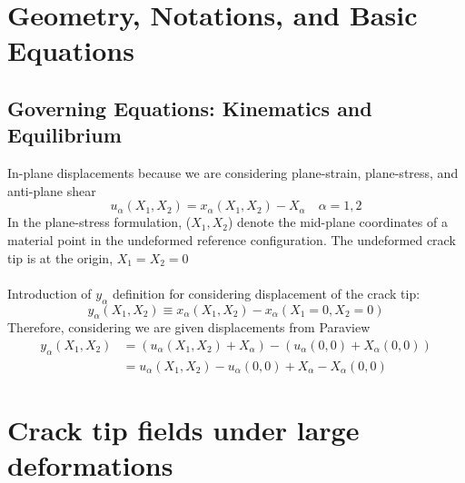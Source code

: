 \documentclass[12pt,3p]{article}
\numberwithin{equation}{section}
\begin{document}
\section{Geometry, Notations, and Basic Equations}

\subsection{Governing Equations: Kinematics and Equilibrium}
In-plane displacements because we are considering plane-strain, plane-stress, and anti-plane shear
\begin{equation}
u_{\alpha}\left(X_{1}, X_{2}\right)=x_{\alpha}\left(X_{1}, X_{2}\right)-X_{\alpha} \quad \alpha=1,2
\end{equation}
In the plane-stress formulation, ($X_1, X_2$) denote the mid-plane coordinates of a material point in the undeformed reference configuration. The undeformed crack tip is at the origin, $X_1 = X_2 = 0$\\ \\
Introduction of $y_\alpha$ definition for considering displacement of the crack tip: 
\begin{equation}
y_{\alpha}\left(X_{1}, X_{2}\right) \equiv x_{\alpha}\left(X_{1}, X_{2}\right)-x_{\alpha}\left(X_{1}=0, X_{2}=0\right)
\end{equation}
Therefore, considering we are given displacements from Paraview
\begin{align}
y_{\alpha}\left(X_{1}, X_{2}\right) &=  (u_{\alpha}\left(X_{1}, X_{2}\right) +X_{\alpha}) - (u_{\alpha}\left(0, 0 \right) +X_{\alpha} (0, 0)) \\
&= u_{\alpha}\left(X_{1}, X_{2}\right) - u_{\alpha} (0, 0) + X_{\alpha} - X_{\alpha} (0,0)
\end{align}

\section{Crack tip fields under large deformations}

\end{document}
